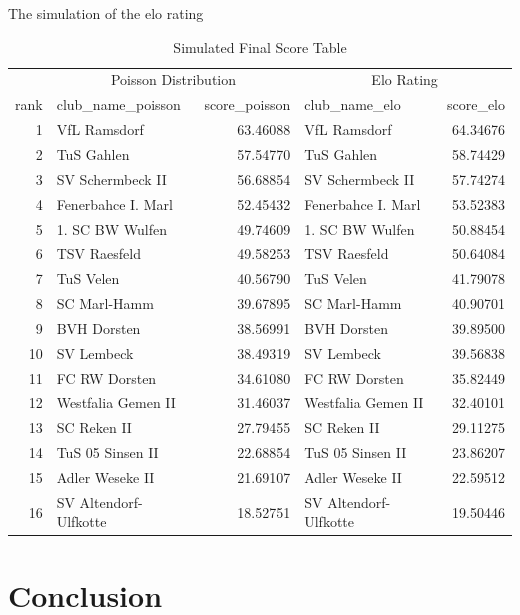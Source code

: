 \documentclass[12pt,a4paper]{article}
\begin{document}
The simulation of the elo rating

\begin{table}[H]

\caption{\label{tab:unnamed-chunk-3}Simulated Final Score Table}
\centering
\begin{tabular}[t]{r|l|r|l|r}
\hline
\multicolumn{1}{c|}{ } & \multicolumn{2}{c|}{Poisson Distribution} & \multicolumn{2}{c}{Elo Rating} \\
\cline{2-3} \cline{4-5}
rank & club\_name\_poisson & score\_poisson & club\_name\_elo & score\_elo\\
\hline
\rowcolor{gray!6}  1 & VfL Ramsdorf & 63.46088 & VfL Ramsdorf & 64.34676\\
\hline
2 & TuS Gahlen & 57.54770 & TuS Gahlen & 58.74429\\
\hline
\rowcolor{gray!6}  3 & SV Schermbeck II & 56.68854 & SV Schermbeck II & 57.74274\\
\hline
4 & Fenerbahce I. Marl & 52.45432 & Fenerbahce I. Marl & 53.52383\\
\hline
\rowcolor{gray!6}  5 & 1. SC BW Wulfen & 49.74609 & 1. SC BW Wulfen & 50.88454\\
\hline
6 & TSV Raesfeld & 49.58253 & TSV Raesfeld & 50.64084\\
\hline
\rowcolor{gray!6}  7 & TuS Velen & 40.56790 & TuS Velen & 41.79078\\
\hline
8 & SC Marl-Hamm & 39.67895 & SC Marl-Hamm & 40.90701\\
\hline
\rowcolor{gray!6}  9 & BVH Dorsten & 38.56991 & BVH Dorsten & 39.89500\\
\hline
10 & SV Lembeck & 38.49319 & SV Lembeck & 39.56838\\
\hline
\rowcolor{gray!6}  11 & FC RW Dorsten & 34.61080 & FC RW Dorsten & 35.82449\\
\hline
12 & Westfalia Gemen II & 31.46037 & Westfalia Gemen II & 32.40101\\
\hline
\rowcolor{gray!6}  13 & SC Reken II & 27.79455 & SC Reken II & 29.11275\\
\hline
14 & TuS 05 Sinsen II & 22.68854 & TuS 05 Sinsen II & 23.86207\\
\hline
\rowcolor{gray!6}  15 & Adler Weseke II & 21.69107 & Adler Weseke II & 22.59512\\
\hline
16 & SV Altendorf-Ulfkotte & 18.52751 & SV Altendorf-Ulfkotte & 19.50446\\
\hline
\end{tabular}
\end{table}

\hypertarget{conclusion}{%
\section{Conclusion}\label{conclusion}}

\newpage

\printbibliography
\end{document}
